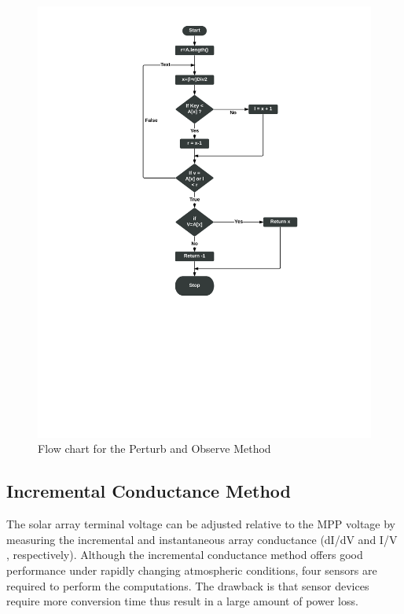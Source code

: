{  \begin{figure}[H]
    \begin{center}
    \includegraphics[width=\textwidth]{images/INc_flow}
    \caption{ Flow chart for the Perturb and Observe Method }
    \label{fig:PnOflow}
    \end{center}
    \end{figure}
  
  \subsection{Incremental Conductance Method }
  The  solar array terminal  voltage  can  be  adjusted relative to the MPP voltage by measuring the incremental and instantaneous  array  conductance (dI/dV and I/V ,   respectively).  Although  the  incremental  conductance method offers good performance under rapidly changing atmospheric  conditions,  four  sensors  are  required to   perform the  computations. The  drawback is that sensor devices require  more  conversion  time  thus  result in a large amount of power loss.   \\
  
}
